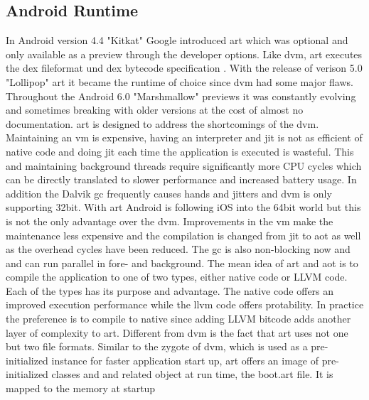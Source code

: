 \subsection{Android Runtime} \label{subsection:android-art}
In Android version 4.4 "Kitkat" Google introduced \gls{art} which was optional and only available as a preview through the developer options.
Like \gls{dvm}, \gls{art} executes the \gls{dex} fileformat und \gls{dex} bytecode specification \cite{androidArt}.
With the release of verison 5.0 "Lollipop" \gls{art} it became the runtime of choice since \gls{dvm} had some major flaws.
Throughout the Android 6.0 "Marshmallow" previews it was constantly evolving and sometimes breaking with older versions at the cost of almost no documentation.
\newline
\gls{art} is designed to address the shortcomings of the \gls{dvm}.
Maintaining an \gls{vm} is expensive, having an interpreter and \gls{jit} is not as efficient of native code and doing \gls{jit} each time the application is executed is wasteful.
This and maintaining background threads require significantly more CPU cycles which can be directly translated to slower performance and increased battery usage.
In addition the Dalvik \gls{gc} frequently causes hands and jitters and \gls{dvm} is only supporting 32bit.
With \gls{art} Android is following iOS into the 64bit world but this is not the only advantage over the \gls{dvm}.
Improvements in the \gls{vm} make the maintenance less expensive and the compilation is changed from \gls{jit} to \gls{aot} as well as the overhead cycles have been reduced.
The \gls{gc} is also non-blocking now and and can run parallel in fore- and background.
\newline
The mean idea of \gls{art} and \gls{aot} is to compile the application to one of two types, either native code or \gls{LLVM} code.
Each of the types has its purpose and advantage.
The native code offers an improved execution performance while the \gls{llvm} code offers protability.
In practice the preference is to compile to native since adding \gls{LLVM} bitcode adds another layer of complexity to \gls{art}.
\newline
Different from \gls{dvm} is the fact that \gls{art} uses not one but two file formats.
Similar to the zygote of \gls{dvm}, which is used as a pre-initialized instance for faster application start up, \gls{art} offers an image of pre-initialized classes and and related object at run time, the boot.art file.
It is mapped to the memory at startup \cite{developersConfigureArt}


